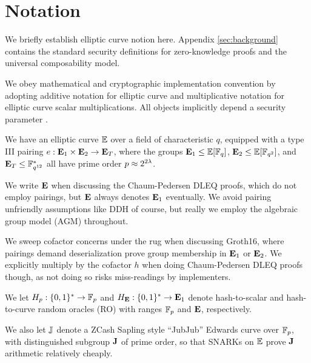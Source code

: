 
\section{Notation}
\label{sec:notation}


We briefly establish elliptic curve notion here.  
Appendix \ref{sec:background} contains the standard security definitions
for zero-knowledge proofs and the universal composability model.

\smallskip 

We obey mathematical and cryptographic implementation convention by 
adopting additive notation for elliptic curve and multiplicative notation
for elliptic curve scalar multiplications.
%
All objects implicitly depend a security parameter \secparam.

We have an elliptic curve ${\mathbb{E}}$ over a field of characteristic $q$,
equipped with a type III pairing $e : {\mathbf{E}}_1 \times {\mathbf{E}}_2 \to {\mathbf{E}}_T$,
where the groups  ${\mathbf{E}}_1 \le {\mathbb{E}}[\mathbb{F}_q]$, ${\mathbf{E}}_2 \le {\mathbb{E}}[\mathbb{F}_{q^2}]$, and
${\mathbf{E}}_T \le \mathbb{F}^*_{q^{12}}$ all have prime order $p \approx 2^{2\lambda}$.

We write ${\mathbf{E}}$ when discussing the Chaum-Pedersen DLEQ proofs, which do
not employ pairings, but ${\mathbf{E}}$ always denotes ${\mathbf{E}}_1$ eventually.
We avoid pairing unfriendly assumptions like DDH of course, but really
we employ the algebraic group model (AGM) throughout.

We sweep cofactor concerns under the rug when discussing Groth16,
where pairings demand deserialization prove group membership in ${\mathbf{E}}_1$
or ${\mathbf{E}}_2$.  We explicitly multiply by the cofactor $h$ when doing
Chaum-Pedersen DLEQ proofs though, as not doing so risks miss-readings by implementers.

We let $H_p : \{0,1\}^* \to \mathbb{F}_p$ and $H_{\mathbf{E}} : \{0,1\}^* \to {\mathbf{E}}_1$
denote hash-to-scalar and hash-to-curve random oracles (RO) with ranges
$\mathbb{F}_p$ and ${\mathbf{E}}$, respectively.  

We also let ${\mathbb{J}}$ denote a ZCash Sapling style ``JubJub'' Edwards curve
over $\mathbb{F}_p$, with distinguished subgroup ${\mathbf{J}}$ of prime order, so that
SNARKs on ${\mathbb{E}}$ prove ${\mathbf{J}}$ arithmetic relatively cheaply.


